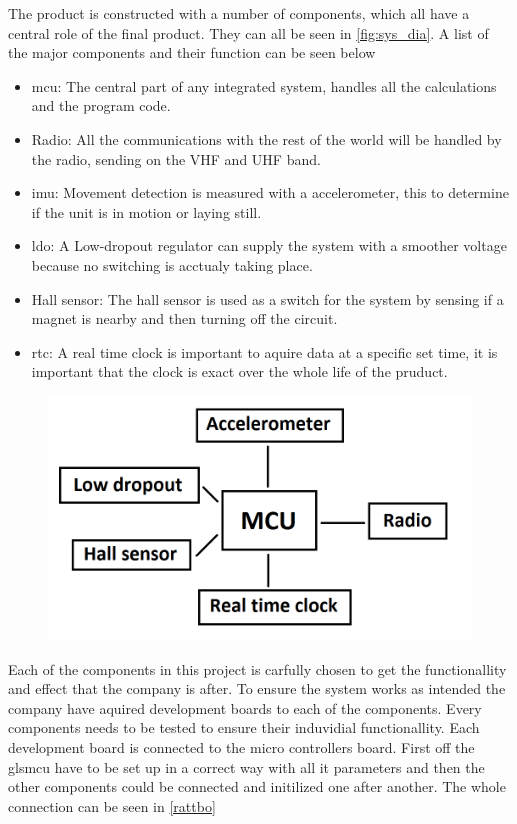 
The product is constructed with a number of components, which all have a central role of the final product. They can all be seen in \autoref{fig:sys_dia}. A list of the major components and their function can be seen below  

\begin{itemize}[noitemsep] 
\item \gls{mcu}: The central part of any integrated system, handles all the calculations and the program code.
\item Radio: All the communications with the rest of the world will be handled by the radio, sending on the VHF and UHF band.
\item \gls{imu}: Movement detection is measured with a accelerometer, this to determine if the unit is  in motion or laying still. 
\item \gls{ldo}: A Low-dropout regulator can supply the system with a smoother voltage because no switching is acctualy taking place.
\item Hall sensor: The hall sensor is used as a switch for the system by sensing if a magnet is nearby and then turning off the circuit.
\item \gls{rtc}: A real time clock is important to aquire data at a specific set time, it is important that the clock is exact over the whole life of the pruduct.
\end{itemize} 


\begin{figure}[H] 
\centering 
\includegraphics[width=.8\linewidth]{Figures/System_diagram} 
\label{fig:sys_dia} 
\end{figure} 

Each of the components in this project is carfully chosen to get the functionallity and effect that the company is after. To ensure the system works as intended the company have aquired development boards to each of the components. Every components needs to be tested to ensure their induvidial functionallity. Each development board is connected to the micro controllers board. First off the gls{mcu} have to be set up in a correct way with all it parameters and then the other components could be connected and initilized one after another. The whole connection can be seen in \autoref{rattbo}


